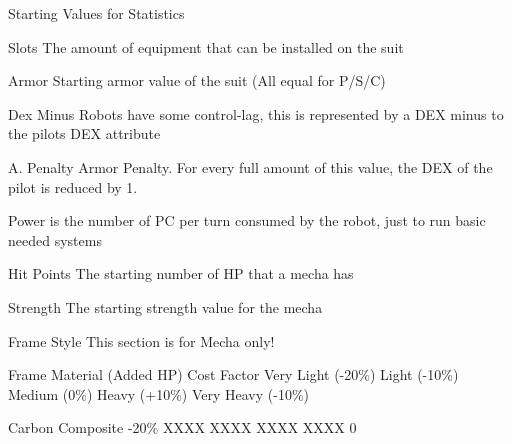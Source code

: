 \documentclass[twoside]{book}
\begin{document}
                    
                  Starting Values for Statistics  
                  
                  
                  
                     Slots 
                      The amount of equipment that can be installed
                     on the suit 
                    
                  
                     Armor 
                      Starting armor value of the suit (All equal
                     for P/S/C) 
                    
                  
                     Dex Minus 
                      Robots have some control-lag, this is
                     represented by a DEX minus to the pilots DEX
                     attribute 
                    
                  
                     A. Penalty 
                      Armor Penalty. For every full amount of this
                     value, the DEX of the pilot is reduced by 1. 
                    
                  
                     Power 
                      is the number of PC per turn consumed by the
                     robot, just to run basic needed systems 
                    
                  
                     Hit Points 
                      The starting number of HP that a mecha has
                     
                    
                  
                     Strength 
                      The starting strength value for the mecha
                     
                    
                  
                
                
                Frame Style  
                 This section is for Mecha only!   
                  
                    
                      
                       Frame Material (Added HP)   
                       Cost Factor   
                       Very Light (-20\%)   
                       Light (-10\%)   
                       Medium (0\%)   
                       Heavy (+10\%)   
                       Very Heavy (-10\%)   
                      
                      
                       Carbon Composite   
                       -20\%   
                       XXXX   
                       XXXX   
                       XXXX   
                       XXXX   
                       0   
                      
\end{document}
